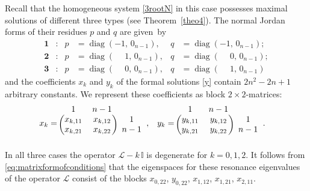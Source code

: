\documentclass{article}
\theoremstyle{plain}
\DeclareMathOperator{\diag}{diag}
\newcommand{\brackets}[1]{\left( #1 \right)}
\begin{document}
Recall that the homogeneous system \eqref{3rootN} in this case possesses maximal solutions of different three types (see Theorem~\ref{theo4}). The normal Jordan forms of their residues $p$ and $q$ are given~by 
\begin{align}
    \textbf{1} 
    &: 
    &
    p
    &= \diag \brackets{-1, \, 0_{n - 1}},
    &
    q
    &= \diag \brackets{-1, \, 0_{n - 1}};
    \\[1mm]
    \textbf{2} 
    &: 
    &
    p
    &= \diag \brackets{\phantom{-}1, \, 0_{n - 1}},
    &
    q
    &= \diag \brackets{\phantom{-}0, \, 0_{n - 1}};
    \\[1mm]
    \textbf{3} 
    &: 
    &
    p
    &= \diag \brackets{\phantom{-}0, \, 0_{n - 1}},
    &
    q
    &= \diag \brackets{\phantom{-}1, \, 0_{n - 1}}
\end{align}
and the coefficients $x_k$ and $y_k$ of the formal solutions \eqref{y} contain $2 n^2 - 2 n + 1$ arbitrary constants. We represent these coefficients as block $2 \times 2$-matrices:
\begin{align}
    x_{k}
    &= 
    \begin{blockarray}{ccc}
      1 & n - 1 &  \\
    \begin{block}{(cc)c}
      x_{k, 11} & x_{k, 12} & 1  \\
      x_{k, 21} & x_{k, 22} & n - 1  \\
    \end{block}
    \end{blockarray},
    &
    y_{k}
    &= 
    \begin{blockarray}{ccc}
      1 & n - 1 &  \\
    \begin{block}{(cc)c}
      y_{k, 11} & y_{k, 12} & 1  \\
      y_{k, 21} & y_{k, 22} & n - 1  \\
    \end{block}
    \end{blockarray}.
\end{align}
In all three cases the operator ${\mathcal L} - k \, \mathbb{I}$ is degenerate for $k = 0,1,2$. It follows from \eqref{eq:matrixformofconditions} that the eigenspaces for these resonance eigenvalues of the operator $\mathcal L$ consist of the blocks  $x_{0, 22}$, $y_{0, 22}$, $x_{1, 12}$, $x_{1, 21}$, $x_{2,11}$.
\end{document}
